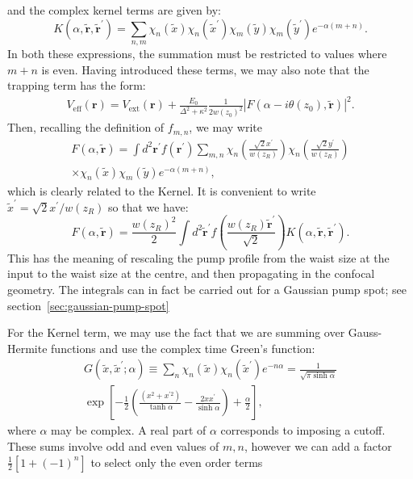 \documentclass[twocolumn]{revtex4-1}
\renewcommand{\vec}[1]{\mathbf{#1}}
\newcommand{\tvr}{\tilde{\vec{r}}}
\newcommand{\tvrp}{\tilde{\vec{r}}^\prime}
\begin{document}
and the complex kernel terms are given by:
\begin{equation}
  \label{eq:4}
  K(\alpha, \tvr, \tvrp)
  =
  \sum_{n,m}
  \chi_n(\tilde{x}) 
  \chi_n(\tilde{x}^\prime) 
  \chi_m(\tilde{y})
  \chi_m(\tilde{y}^\prime)
  e^{-\alpha(m+n)}.
\end{equation}
In both these expressions, the summation must be restricted to values
where $m+n$ is even.  Having introduced these terms, we may also note
that the trapping term has the form:
\begin{multline}
    V_{\text{eff}}(\vec{r}) 
  =
  V_{\text{ext}}(\vec{r}) 
  +
  \frac{E_0}{\Delta^2+\kappa^2}
  \frac{1}{2 w(z_0)^2}\left|
    F(\alpha-i\theta(z_0), \tvr) 
  \right|^2.
\end{multline}
Then, recalling the definition of $f_{m,n}$, we may write
\begin{multline}
  F(\alpha, \tvr) 
  = \int d^2\vec{r}^\prime f(\vec{r}^\prime) \sum_{m,n}
  \chi_n\left( \frac{\sqrt{2} x^\prime}{w(z_R)} \right)
  \chi_n\left( \frac{\sqrt{2} y^\prime}{w(z_R)} \right)
  \\\times  
  \chi_n(\tilde{x}) 
  \chi_m(\tilde{y})
  e^{-\alpha(m+n)},
\end{multline}
which is clearly related to the Kernel.  It is convenient to
write $\tilde{{x}}^\prime = \sqrt{2} x^\prime / w(z_R)$ so that we have:
\begin{displaymath}
  F(\alpha, \tvr) 
  = \frac{w(z_R)^2}{2}
  \int d^2\tilde{{\vec{r}}}^\prime
  f\left( \frac{w(z_R) \tilde{{\vec{r}}}^\prime}{\sqrt{2}} \right)
  K(\alpha, \tvr, \tilde{{\vec{r}}}^\prime).
\end{displaymath}
This has the meaning of rescaling the pump profile from the waist size
at the input to the waist size at the centre, and then propagating in
the confocal geometry.   The integrals can in fact be carried out
for a Gaussian pump spot; see section~\ref{sec:gaussian-pump-spot}

For the Kernel term, we may use the fact that we are summing
over Gauss-Hermite functions and use the complex time
Green's function:
\begin{multline}
  \label{eq:5}
  G(\tilde{x}, \tilde{x}^\prime; \alpha)
  \equiv
  \sum_n 
  \chi_n(\tilde{x}) 
  \chi_n(\tilde{x}^\prime) 
  e^{-n \alpha}
  = \frac{1}{\sqrt{\pi \sinh \alpha}}
  \\
  \exp\left[
  - \frac{1}{2} \left(
    \frac{(x^2 + x^{\prime 2})}{\tanh\alpha}
    - \frac{2 x x^\prime}{\sinh \alpha} \right)
  + \frac{\alpha}{2} \right],
\end{multline}
where $\alpha$ may be complex.  A real part of $\alpha$ corresponds to
imposing a cutoff.  These sums involve odd and even values of $m,n$, 
however we can add a factor $\frac{1}{2}[1+(-1)^n]$ to select only 
the even order terms
\end{document}

